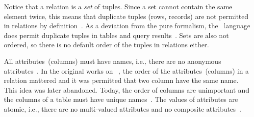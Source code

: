 Notice that a relation is a \emph{set} of tuples.
Since a set cannot contain the same element twice, this means that duplicate tuples (rows, records) are not permitted in relations by definition~\cite{C20245YOQ}.
As a deviation from the pure formalism, the \sql\ language does permit duplicate tuples in tables and query results~\cite{C20245YOQ}.
Sets are also not ordered, so there is no default order of the tuples in relations either.

All attributes~(columns) must have names, i.e., there are no anonymous attributes~\cite{S2024D:LDMRMRA}.
In the original works on ~\cite{C1970ARMODFLSDB}, the order of the attributes~(columns) in a relation mattered and it was permitted that two column have the same name.
This idea was later abandoned.
Today, the order of columns are unimportant and the columns of a table must have unique names~\cite{S2024D:LDMRMRA}.
The values of attributes are atomic, i.e., there are no multi-valued attributes and no composite attributes~\cite{S2024D:LDMRMRA,SS2005EIDDDFDB:SDLDUTRDM}.

